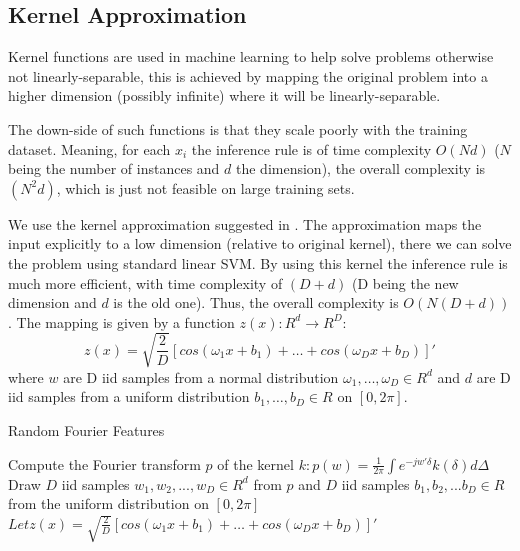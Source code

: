 \documentclass[12pt,a4paper]{article}
\begin{document}
\subsection{Kernel Approximation}
Kernel functions are used in machine learning to help solve problems otherwise not linearly-separable, this is achieved by mapping the original problem into a higher dimension (possibly infinite) where it will be linearly-separable. 

The down-side of such functions is that they scale poorly with the training dataset. Meaning, for each $x_i$ the inference rule is of time complexity $O(Nd)$ ($N$ being the number of instances and $d$ the dimension), the overall complexity is $(N^2d)$, which is just not feasible on large training sets. 

We use the kernel approximation suggested in \cite{Rahimi07randomfeatures}. The approximation maps the input explicitly to a low dimension (relative to original kernel), there we can solve the problem using standard linear SVM. By using this kernel the inference rule is much more efficient, with time complexity of $(D+d)$ (D being the new dimension and $d$ is the old one). Thus, the overall complexity is $O(N(D+d))$. 
The mapping is given by a function $z(x): R^d \rightarrow R^D$:
\begin{equation}
z(x) = \sqrt{\frac{2}{D}}[cos(\omega_1 x + b_1) + \dots + cos(\omega_D x + b_D)]'
\end{equation}
where $w$ are D iid samples from a normal distribution $\omega_1,\dots,\omega_D \in R^d$
and $d$ are D iid samples from a uniform distribution $b_1,\dots,b_D \in R$ on $[0, 2\pi]$.

\begin{algorithm}
        \caption{Random Fourier Features}
        \label{rff_alg}
        \begin{algorithmic}[1]
                \State Compute the Fourier transform $p$ of the kernel $k: p(w) = \frac{1}{2\pi} \int e^{-jw'\delta} k(\delta) d\Delta$
                \State Draw $D$ iid samples $w_1,w_2,...,w_D \in R^d$ from $p$ and $D$ iid samples $b_1,b_2,...b_D \in R$ from the uniform distribution on $[0,2\pi]$
                \State $Let z(x) = \sqrt{\frac{2}{D}}[cos(\omega_1 x + b_1) + \dots + cos(\omega_D x + b_D)]'$
                \EndProcedure
        \end{algorithmic}
\end{algorithm}
\end{document}
